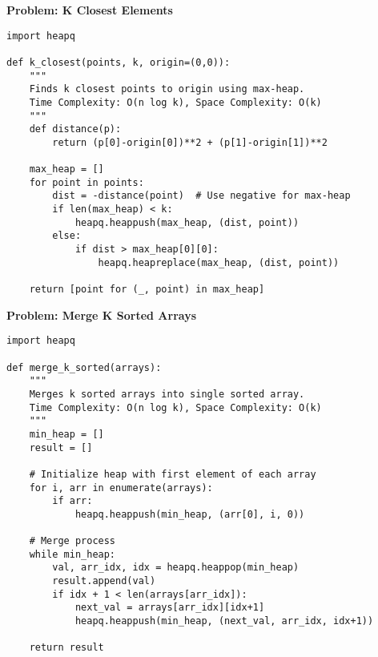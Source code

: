 \noindent\textbf{Problem: K Closest Elements}
\begin{verbatim}
import heapq

def k_closest(points, k, origin=(0,0)):
    """
    Finds k closest points to origin using max-heap.
    Time Complexity: O(n log k), Space Complexity: O(k)
    """
    def distance(p):
        return (p[0]-origin[0])**2 + (p[1]-origin[1])**2
    
    max_heap = []
    for point in points:
        dist = -distance(point)  # Use negative for max-heap
        if len(max_heap) < k:
            heapq.heappush(max_heap, (dist, point))
        else:
            if dist > max_heap[0][0]:
                heapq.heapreplace(max_heap, (dist, point))
    
    return [point for (_, point) in max_heap]
\end{verbatim}

\noindent\textbf{Problem: Merge K Sorted Arrays}
\begin{verbatim}
import heapq

def merge_k_sorted(arrays):
    """
    Merges k sorted arrays into single sorted array.
    Time Complexity: O(n log k), Space Complexity: O(k)
    """
    min_heap = []
    result = []
    
    # Initialize heap with first element of each array
    for i, arr in enumerate(arrays):
        if arr:
            heapq.heappush(min_heap, (arr[0], i, 0))
    
    # Merge process
    while min_heap:
        val, arr_idx, idx = heapq.heappop(min_heap)
        result.append(val)
        if idx + 1 < len(arrays[arr_idx]):
            next_val = arrays[arr_idx][idx+1]
            heapq.heappush(min_heap, (next_val, arr_idx, idx+1))
    
    return result
\end{verbatim}

